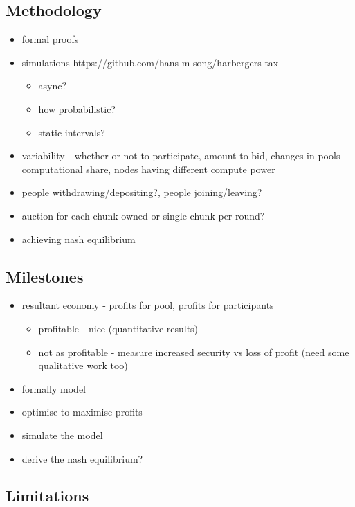 \subsection{Methodology}

\begin{itemize}
  \item formal proofs
  \item simulations https://github.com/hans-m-song/harbergers-tax 
  \begin{itemize}
    \item async? 
    \item how probabilistic?
    \item static intervals?
  \end{itemize}
  \item variability - whether or not to participate, amount to bid, changes in pools computational share, nodes having different compute power
  \item people withdrawing/depositing?, people joining/leaving?
  \item auction for each chunk owned or single chunk per round?
  \item achieving nash equilibrium
\end{itemize}

\subsection{Milestones}

\begin{itemize}
  \item resultant economy - profits for pool, profits for participants
  \begin{itemize}
    \item profitable - nice (quantitative results)
    \item not as profitable - measure increased security vs loss of profit (need some qualitative work too)
  \end{itemize}
\end{itemize}

\begin{itemize}
  \item formally model
  \item optimise to maximise profits
  \item simulate the model
  \item derive the nash equilibrium?
\end{itemize} 

\subsection{Limitations}

